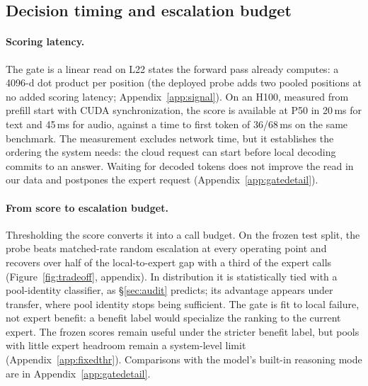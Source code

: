 \subsection{Decision timing and escalation budget}
\label{sec:system}

\paragraph{Scoring latency.}
The gate is a linear read on L22 states the forward pass already
computes: a 4096-d dot product per position (the deployed probe adds
two pooled positions at no added scoring latency;
Appendix~\ref{app:signal}). On an H100, measured from prefill start
with CUDA synchronization, the score is available at P50 in
20\,ms for text and 45\,ms for audio, against a time to first token
of 36/68\,ms on the same benchmark. The measurement excludes network
time, but it establishes the ordering the system needs: the cloud
request can start before local decoding commits to an answer.
Waiting for decoded tokens does not improve the read in our data and
postpones the expert request (Appendix~\ref{app:gatedetail}).

\paragraph{From score to escalation budget.}
Thresholding the score converts it into a call budget. On the frozen
test split, the probe beats matched-rate random escalation at every
operating point and recovers over half of the local-to-expert gap
with a third of the expert calls (Figure~\ref{fig:tradeoff},
appendix). In distribution it is statistically tied with a
pool-identity classifier, as \S\ref{sec:audit} predicts; its
advantage appears under transfer, where pool identity stops being
sufficient. The gate is fit to local failure, not expert benefit: a
benefit label would specialize the ranking to the current expert. The
frozen scores remain useful under the stricter benefit label, but
pools with little expert headroom remain a system-level limit
(Appendix~\ref{app:fixedthr}). Comparisons with the model's built-in
reasoning mode are in Appendix~\ref{app:gatedetail}.
